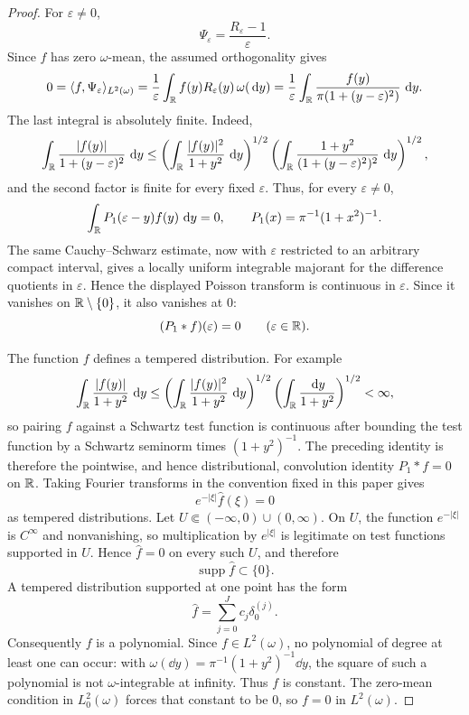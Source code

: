 \begin{proof}
For \(\varepsilon\ne0\),
\[
\Psi_\varepsilon=\frac{R_\varepsilon-1}{\varepsilon}.
\]
Since \(f\) has zero \(\omega\)-mean, the assumed orthogonality gives
\[
0=\langle f,\Psi_\varepsilon\rangle_{L^2(\omega)}
=\frac1{\varepsilon}\int_{\mathbb{R}}f(y)R_\varepsilon(y)\,\omega(\,\mathrm{d} y)
=\frac1{\varepsilon}\int_{\mathbb{R}}
\frac{f(y)}{\pi(1+(y-\varepsilon)^2)}\,\,\mathrm{d} y .
\]
The last integral is absolutely finite.  Indeed,
\[
\int_{\mathbb{R}}\frac{|f(y)|}{1+(y-\varepsilon)^2}\,\,\mathrm{d} y
\le
\left(\int_{\mathbb{R}}\frac{|f(y)|^2}{1+y^2}\,\,\mathrm{d} y\right)^{1/2}
\left(\int_{\mathbb{R}}
\frac{1+y^2}{(1+(y-\varepsilon)^2)^2}\,\,\mathrm{d} y\right)^{1/2},
\]
and the second factor is finite for every fixed \(\varepsilon\).  Thus, for
every \(\varepsilon\ne0\),
\[
\int_{\mathbb{R}}P_1(\varepsilon-y)f(y)\,\,\mathrm{d} y=0,
\qquad
P_1(x)=\pi^{-1}(1+x^2)^{-1}.
\]
The same Cauchy--Schwarz estimate, now with \(\varepsilon\) restricted to an
arbitrary compact interval, gives a locally uniform integrable majorant for
the difference quotients in \(\varepsilon\).  Hence the displayed Poisson
transform is continuous in \(\varepsilon\).  Since it vanishes on
\(\mathbb{R}\setminus\{0\}\), it also vanishes at \(0\):
\[
(P_1*f)(\varepsilon)=0\qquad(\varepsilon\in\mathbb{R}).
\]

The function \(f\) defines a tempered distribution.  For example
\[
\int_{\mathbb{R}}\frac{|f(y)|}{1+y^2}\,\,\mathrm{d} y
\le
\left(\int_{\mathbb{R}}\frac{|f(y)|^2}{1+y^2}\,\,\mathrm{d} y\right)^{1/2}
\left(\int_{\mathbb{R}}\frac{\,\mathrm{d} y}{1+y^2}\right)^{1/2}<\infty,
\]
so pairing \(f\) against a Schwartz test function is continuous after
bounding the test function by a Schwartz seminorm times \((1+y^2)^{-1}\).
The preceding identity is therefore the pointwise, and hence
distributional, convolution identity \(P_1*f=0\) on \(\mathbb{R}\).
Taking Fourier transforms in the convention fixed in this paper gives
\[
e^{-|\xi|}\widehat f(\xi)=0
\]
as tempered distributions.  Let
\(U\Subset(-\infty,0)\cup(0,\infty)\).  On \(U\), the function
\(e^{-|\xi|}\) is \(C^\infty\) and nonvanishing, so multiplication by
\(e^{|\xi|}\) is legitimate on test functions supported in \(U\).  Hence
\(\widehat f=0\) on every such \(U\), and therefore
\[
\operatorname{supp}\widehat f\subset\{0\}.
\]
A tempered distribution supported at one point has the form
\[
\widehat f=\sum_{j=0}^{J}c_j\delta_0^{(j)} .
\]
Consequently \(f\) is a polynomial.  Since
\(f\in L^2(\omega)\), no polynomial of degree at least one can occur:
with \(\omega(\dd y)=\pi^{-1}(1+y^2)^{-1}\dd y\), the square of such a
polynomial is not \(\omega\)-integrable at infinity.  Thus \(f\) is
constant.  The zero-mean condition in \(L^2_0(\omega)\) forces that
constant to be \(0\), so \(f=0\) in \(L^2(\omega)\).
\end{proof}

